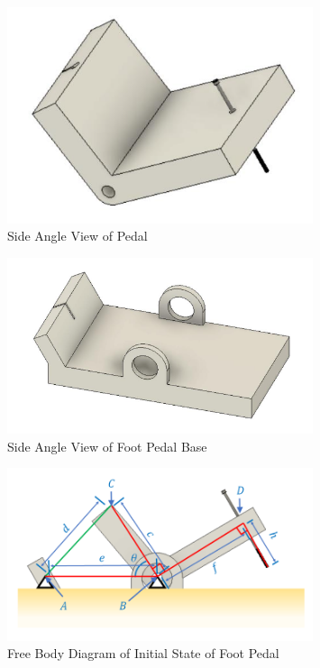 \documentclass[12pt]{article}
\theoremstyle{definition} %
\theoremstyle{plain} %
\begin{document}
  \begin{figure}[htbp]
    \centering
    \includegraphics[width=0.8\textwidth]{classes/Mathematics-of-Guitar-Strings/06-10/fgs/fig16.png}
    \caption{Side Angle View of Pedal}
    \label{fig:}
  \end{figure}
  \begin{figure}[htbp]
    \centering
    \includegraphics[width=0.8\textwidth]{classes/Mathematics-of-Guitar-Strings/06-10/fgs/fig17.png}
    \caption{Side Angle View of Foot Pedal Base}
    \label{fig:}
  \end{figure}

  \begin{figure}[htbp]
    \centering
    \includegraphics[width=0.8\textwidth]{classes/Mathematics-of-Guitar-Strings/06-10/fgs/fig18.png}
    \caption{Free Body Diagram of Initial State of Foot Pedal}
    \label{fig:}
  \end{figure}
\end{document}
